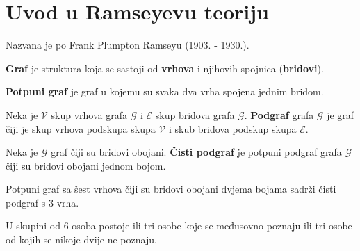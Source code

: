 \section{Uvod u Ramseyevu teoriju}

Nazvana je po Frank Plumpton Ramseyu (1903. - 1930.).

\begin{definition}
    \textbf{Graf} je struktura koja se sastoji od \textbf{vrhova} i njihovih
    spojnica (\textbf{bridovi}).
\end{definition}

\begin{definition}
    \textbf{Potpuni graf} je graf u kojemu su svaka dva vrha spojena jednim
    bridom.
\end{definition}

\begin{definition}
    Neka je $\mathcal{V}$ skup vrhova grafa $\mathcal{G}$ i $\mathcal{E}$ skup
    bridova grafa $\mathcal{G}$. \textbf{Podgraf} grafa $\mathcal{G}$ je graf
    čiji je skup vrhova podskupa skupa $\mathcal{V}$ i skub bridova podskup
    skupa $\mathcal{E}$.
\end{definition}

\begin{definition}
    Neka je $\mathcal{G}$ graf čiji su bridovi obojani. \textbf{Čisti podgraf}
    je potpuni podgraf grafa $\mathcal{G}$ čiji su bridovi obojani jednom bojom.
\end{definition}

\begin{theorem}
    Potpuni graf sa šest vrhova čiji su bridovi obojani dvjema bojama sadrži
    čisti podgraf s 3 vrha.
\end{theorem}

\begin{theorem}
    U skupini od 6 osoba postoje ili tri osobe koje se međusovno poznaju ili tri
    osobe od kojih se nikoje dvije ne poznaju.
\end{theorem}
